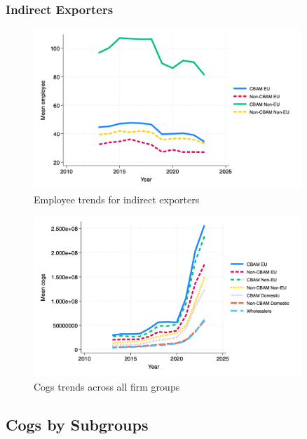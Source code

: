 \documentclass{article}
\begin{document}
\subsubsection{Indirect Exporters}
\begin{figure}[h!]
\centering
\includegraphics[width=0.9\textwidth]{employee_indir.png}
\caption{Employee trends for indirect exporters}
\label{fig:employee_indir}
\end{figure}

\begin{figure}[h!]
\centering
\includegraphics[width=0.9\textwidth]{cogs_main_groups.png}
\caption{Cogs trends across all firm groups}
\label{fig:cogs_main}
\end{figure}

\subsection{Cogs by Subgroups}
\end{document}

